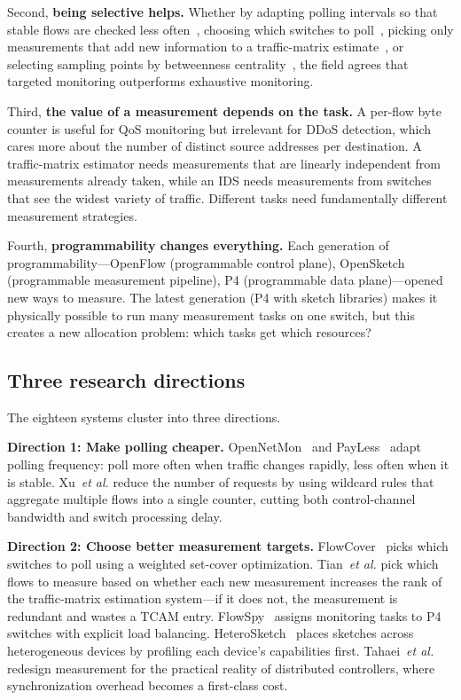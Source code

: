 \documentclass[letterpaper,twocolumn,10pt]{article}
\newcommand{\etal}{\textit{et al.}\xspace}
\newcommand{\para}[1]{\smallskip\noindent\textbf{#1.}}
\begin{document}
Second, \textbf{being selective helps.} Whether by adapting
polling intervals so that stable flows are checked less
often~\cite{adrichem2014opennetmon, chowdhury2014payless},
choosing which switches to poll~\cite{su2014flowcover}, picking
only measurements that add new information to a traffic-matrix
estimate~\cite{tian2018trafficmatrix}, or selecting sampling
points by betweenness centrality~\cite{yoon2017sampling}, the
field agrees that targeted monitoring outperforms exhaustive
monitoring.

Third, \textbf{the value of a measurement depends on the task.}
A per-flow byte counter is useful for QoS monitoring but
irrelevant for DDoS detection, which cares more about the number
of distinct source addresses per destination. A traffic-matrix
estimator needs measurements that are linearly independent from
measurements already taken, while an IDS needs measurements from
switches that see the widest variety of traffic. Different tasks
need fundamentally different measurement strategies.

Fourth, \textbf{programmability changes everything.} Each
generation of programmability---OpenFlow (programmable control
plane), OpenSketch (programmable measurement pipeline), P4
(programmable data plane)---opened new ways to measure. The latest
generation (P4 with sketch libraries) makes it physically possible
to run many measurement tasks on one switch, but this creates a
new allocation problem: which tasks get which resources?

\subsection{Three research directions}

The eighteen systems cluster into three directions.

\para{Direction 1: Make polling cheaper}
OpenNetMon~\cite{adrichem2014opennetmon} and
PayLess~\cite{chowdhury2014payless} adapt polling frequency:
poll more often when traffic changes rapidly, less often when it
is stable. Xu~\etal\cite{xu2017wildcard} reduce the number of
requests by using wildcard rules that aggregate multiple flows
into a single counter, cutting both control-channel bandwidth and
switch processing delay.

\para{Direction 2: Choose better measurement targets}
FlowCover~\cite{su2014flowcover} picks which switches to poll
using a weighted set-cover optimization.
Tian~\etal\cite{tian2018trafficmatrix} pick which flows to
measure based on whether each new measurement increases the rank
of the traffic-matrix estimation system---if it does not, the
measurement is redundant and wastes a TCAM entry.
FlowSpy~\cite{guan2019flowspy} assigns monitoring tasks to P4
switches with explicit load balancing.
HeteroSketch~\cite{agarwal2022heterosketch} places sketches
across heterogeneous devices by profiling each device's
capabilities first.
Tahaei~\etal\cite{tahaei2018distributed} redesign measurement
for the practical reality of distributed controllers, where
synchronization overhead becomes a first-class cost.
\end{document}
